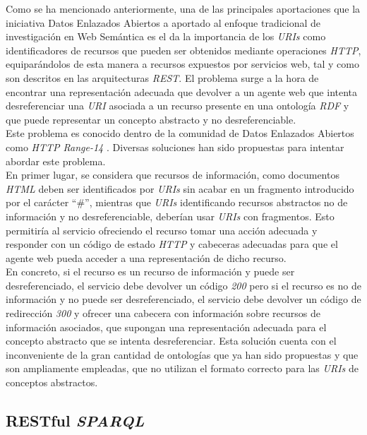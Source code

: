 Como se ha mencionado anteriormente, una de las principales aportaciones que la iniciativa Datos Enlazados Abiertos a aportado al enfoque tradicional de investigaci\'on en Web Sem\'antica es el da la importancia de los \textit{URIs} como identificadores de recursos que pueden ser obtenidos mediante operaciones \textit{HTTP}, equipar\'andolos de esta manera a recursos expuestos por servicios web, tal y como son descritos en las arquitecturas \textit{REST}. El problema surge a la hora de encontrar una representaci\'on adecuada que devolver a un agente web que intenta desreferenciar una \textit{URI} asociada a un recurso presente en una ontolog\'ia \textit{RDF} y que puede representar un concepto abstracto y no desreferenciable.\\
Este problema es conocido dentro de la comunidad de Datos Enlazados Abiertos como \textit{HTTP Range-14} \cite{fielding2005httprange}. Diversas soluciones han sido propuestas para intentar abordar este problema.\\
En primer lugar, se considera que recursos de informaci\'on, como documentos \textit{HTML} deben ser identificados por \textit{URIs} sin acabar en un fragmento introducido por el car\'acter ``\#'', mientras que \textit{URIs} identificando recursos abstractos no de informaci\'on y no desreferenciable, deber\'ian usar \textit{URIs} con fragmentos. Esto permitir\'ia al servicio ofreciendo el recurso tomar una acci\'on adecuada y responder con un c\'odigo de estado \textit{HTTP} y cabeceras adecuadas para que el agente web pueda acceder a una representaci\'on de dicho recurso.\\
En concreto, si el recurso es un recurso de informaci\'on y puede ser desreferenciado, el servicio debe devolver un c\'odigo \textit{200} pero si el recurso es no de informaci\'on y no puede ser desreferenciado, el servicio debe devolver un c\'odigo de redirecci\'on \textit{300} y ofrecer una cabecera con informaci\'on sobre recursos de informaci\'on asociados, que supongan una representaci\'on adecuada para el concepto abstracto que se intenta desreferenciar.  Esta soluci\'on cuenta con el inconveniente de la gran cantidad de ontolog\'ias que ya han sido propuestas y que son ampliamente empleadas, que no utilizan el formato correcto para las \textit{URIs} de conceptos abstractos.


\subsection{RESTful \textit{SPARQL}}


